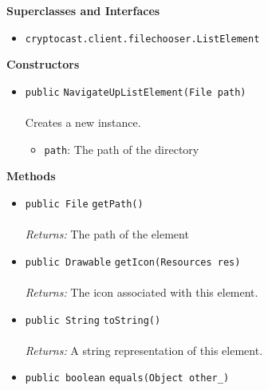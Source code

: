 \textbf{\sffamily Superclasses and Interfaces}
\begin{itemize}
\item \lstinline|cryptocast.client.filechooser.ListElement|
\end{itemize}


\textbf{\sffamily Constructors}
\begin{itemize}
\item \lstinline|public| \lstinline|NavigateUpListElement|\lstinline|(File path)|\\ \\[-0.6em]
Creates a new instance.
\begin{itemize}
\item \lstinline|path|: The path of the directory
\end{itemize}



\end{itemize}


\textbf{\sffamily Methods}
\begin{itemize}
\item \lstinline|public File| \lstinline|getPath|\lstinline|()|\\ \\[-0.6em]
\emph{Returns:} The path of the element



\item \lstinline|public Drawable| \lstinline|getIcon|\lstinline|(Resources res)|\\ \\[-0.6em]
\emph{Returns:} The icon associated with this element.



\item \lstinline|public String| \lstinline|toString|\lstinline|()|\\ \\[-0.6em]
\emph{Returns:} A string representation of this element.



\item \lstinline|public boolean| \lstinline|equals|\lstinline|(Object other_)| \\[-0.6em]




\end{itemize}

